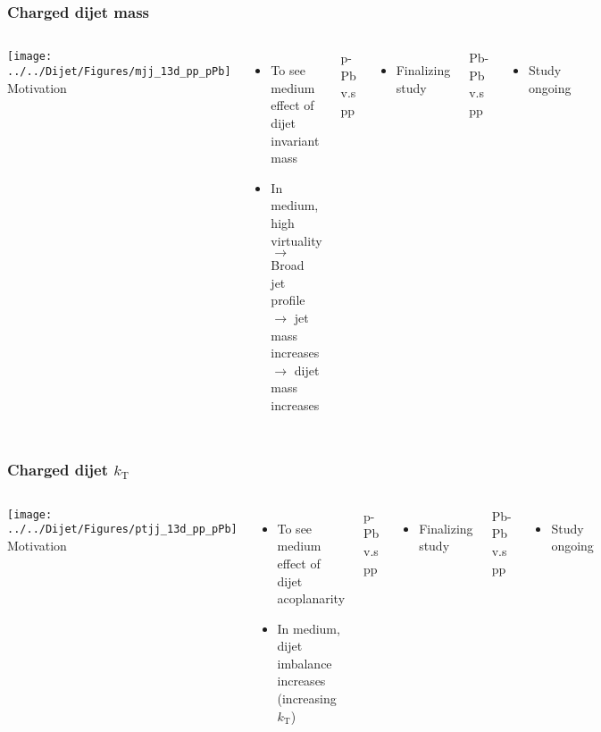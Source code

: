 \begin{frame}
\frametitle{Charged dijet mass}
\begin{columns}[c]
\centering
\texttt{[image: ../../Dijet/Figures/mjj\_13d\_pp\_pPb]}\\
Motivation\\
\begin{itemize}
	\item{To see medium effect of dijet invariant mass}
	\item{In medium, high virtuality \\ $\rightarrow$ Broad jet profile
	\\ $\rightarrow$ jet mass increases 
	\\ $\rightarrow$ dijet mass increases }
\end{itemize}

p-Pb v.s pp
\begin{itemize}
	\item{Finalizing study}
\end{itemize}
Pb-Pb v.s pp
\begin{itemize}
	\item{Study ongoing}
\end{itemize}

\end{columns}
\end{frame}




\begin{frame}
\frametitle{Charged dijet $k_\mathrm{T}$}
\begin{columns}[c]
\centering
\texttt{[image: ../../Dijet/Figures/ptjj\_13d\_pp\_pPb]}\\
Motivation\\
\begin{itemize}
	\item{To see medium effect of dijet acoplanarity}
	\item{In medium, dijet imbalance increases (increasing  $k_\mathrm{T}$)}
\end{itemize}

p-Pb v.s pp
\begin{itemize}
	\item{Finalizing study}
\end{itemize}
Pb-Pb v.s pp
\begin{itemize}
	\item{Study ongoing}
\end{itemize}

\end{columns}
\end{frame}




